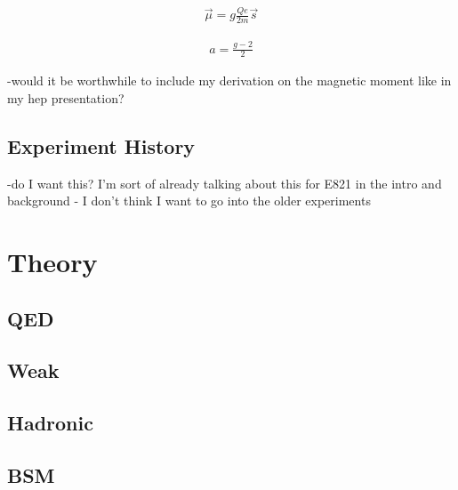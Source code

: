 		\begin{align} \label{eq:magneticmoment}
            \vec{\mu} = g \frac{Qe}{2m} \vec{s}
		\end{align}

		\begin{align} \label{eq:anamoly}
            a = \frac{g-2}{2}
		\end{align}


-would it be worthwhile to include my derivation on the magnetic moment like in my hep presentation?



\subsection{Experiment History}
\label{subsec:ExperimentHistory}

-do I want this? I'm sort of already talking about this for E821 in the intro and background - I don't think I want to go into the older experiments



\section{Theory}
\label{sec:Theory}

\subsection{QED}
\label{subsec:QED}

\subsection{Weak}
\label{subsec:Weak}

\subsection{Hadronic}
\label{subsec:Hadronic}

\subsection{BSM}
\label{subsec:BSM}
